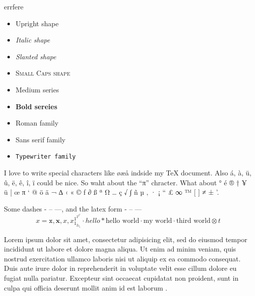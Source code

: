 errfere


\begin{itemize}
    \item \textup{Upright shape}
    \item \textit{Italic shape}
    \item \textsl{Slanted shape}
    \item \textsc{Small Caps shape}
    \item \textmd{Medium series}
    \item \textbf{Bold sereies}
    \item \textrm{Roman family}
    \item \textsf{Sans serif family}
    \item \texttt{Typewriter family}
\end{itemize}

I love to write special characters like øæå indside my \TeX{} document. Also á, à, ü, û, ë, ê, î, ï could be nice. So waht about the ``π'' chracter. What about ° é ® † ¥ ü | œ π ‘ @ ö ä ¬ ∆ ‹ « © ƒ ∂ ß ª Ω … ç √ ∫ ñ µ ‚ · ¡ “ £ ∞ ™ [ ] ≠ ± '.

Some dashes - – —, and the latex form - -- ---
\begin{equation*}
    x = \mathtt{x}, \mathbf{x}, \mathit{x}, x_{1_{2_{3_{4}}}}^{1^{2^{3^{4}}}} \cdot hello * \text{hello world} ⋅ \text{my world} · \text{third world} ⊗ t
\end{equation*}

Lorem ipsum dolor sit amet, consectetur adipisicing elit, sed do eiusmod tempor incididunt ut labore et dolore magna aliqua. Ut enim ad minim veniam, quis nostrud exercitation ullamco laboris nisi ut aliquip ex ea commodo consequat. Duis aute irure dolor in reprehenderit in voluptate velit esse cillum dolore eu fugiat nulla pariatur. Excepteur sint occaecat cupidatat non proident, sunt in culpa qui officia deserunt mollit anim id est laborum \cite{adams1980hitchhiker}.

